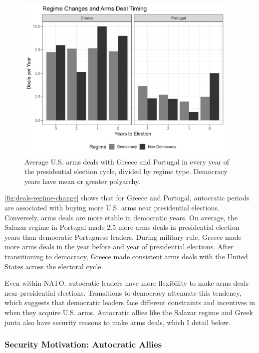 \documentclass[12pt]{article}
\begin{document}
\begin{figure}[htpb]
	\centering
		\includegraphics[width=0.95\textwidth]{../figures/deals-regime-change.png}
	\caption{Average U.S. arms deals with Greece and Portugal in every year of the presidential election cycle, divided by regime type. Democracy years have mean or greater polyarchy.}
	\label{fig:deals-regime-change}
\end{figure}


\autoref{fig:deals-regime-change} shows that for Greece and Portugal, autocratic periods are associated with buying more U.S. arms near presidential elections.
Conversely, arms deals are more stable in democratic years. 
On average, the Salazar regime in Portugal made 2.5 more arms deals in presidential election years than democratic Portuguese leaders.
During military rule, Greece made more arms deals in the year before and year of presidential elections.
After transitioning to democracy, Greece made consistent arms deals with the United States across the electoral cycle.


Even within NATO, autocratic leaders have more flexibility to make arms deals near presidential elections. 
Transitions to democracy attenuate this tendency, which suggests that democratic leaders face different constraints and incentives in when they acquire U.S. arms. 
Autocratic allies like the Salazar regime and Greek junta also have security reasons to make arms deals, which I detail below. 



\subsubsection{Security Motivation: Autocratic Allies}
\end{document}
